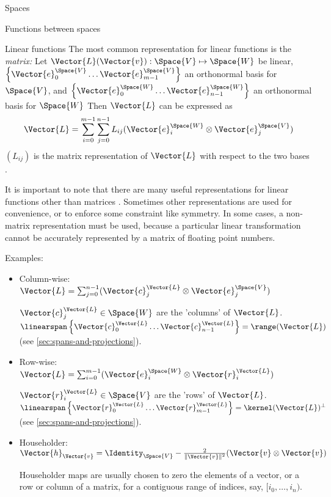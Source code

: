 \begin{plSection}{Spaces}
\begin{plSection}{Functions between spaces}
\begin{plSection}{Linear functions}
The most common representation for linear functions is the \textit{matrix:}
Let $\Vector{L}(\Vector{v}):\Space{V} \mapsto \Space{W}$ be linear,
$\left\{ \Vector{e}_0^{\Space{V}} \ldots  \Vector{e}_{m-1}^{\Space{V}} \right\}$ an orthonormal basis for $\Space{V}$,
and
$\left\{ \Vector{e}_0^{\Space{W}} \ldots \Vector{e}_{n-1}^{\Space{W}} \right\}$ an orthonormal  basis for $\Space{W}$
Then $\Vector{L}$ can be expressed as
\begin{equation}
\Vector{L}
 =
\sum_{i=0}^{m-1} \sum_{j=0}^{n-1} L_{ij} ( \Vector{e}_i^{\Space{W}} \otimes \Vector{e}_j^{\Space{V}} )
\end{equation}
$(L_{ij})$ is the matrix representation of $\Vector{L}$ with respect to
the two bases .

It is important to note that there are many useful
representations for linear functions other than 
matrices .
Sometimes other representations are used for convenience,
or to enforce some constraint like symmetry.
In some cases, a non-matrix representation must be used,
because a particular linear transformation
cannot be accurately represented by a matrix of floating point numbers.

Examples:

\begin{itemize}

\item Column-wise:
$\Vector{L} = \sum_{j=0}^{n-1} ( \Vector{c}_j^{\Vector{L}} \otimes \Vector{e}_j^{\Space{V}} )$

$\Vector{c}_j^{\Vector{L}} \in \Space{W}$ are the 'columns' of $\Vector{L}$.
$\linearspan\left\{ \Vector{c}_0^{\Vector{L}} \ldots \Vector{c}_{n-1}^{\Vector{L}} \right\} = \range(\Vector{L})$
(see \cref{sec:spans-and-projections}).

\item Row-wise:
$\Vector{L} = \sum_{i=0}^{m-1} ( \Vector{e}_i^{\Space{W}} \otimes  \Vector{r}_i^{\Vector{L}} )$

$\Vector{r}_i^{\Vector{L}} \in \Space{V}$ are the 'rows' of $\Vector{L}$.
$\linearspan\left\{ \Vector{r}_0^{\Vector{L}} \ldots \Vector{r}_{m-1}^{\Vector{L}} \right\} =  \kernel(\Vector{L})^{\perp}$
(see \cref{sec:spans-and-projections}).

\item Householder:
$\Vector{h}_{\Vector{v}} = \Identity_{\Space{V}} - \frac{2}{\| \Vector{v} \|^2} (\Vector{v} \otimes \Vector{v})$

Householder maps are usually chosen to zero the elements of
a vector, or a row or column of a matrix, for a contiguous range of
indices, say, $[i_0,\ldots,i_n)$.


\end{itemize}
\end{plSection}
\end{plSection}
\end{plSection}
